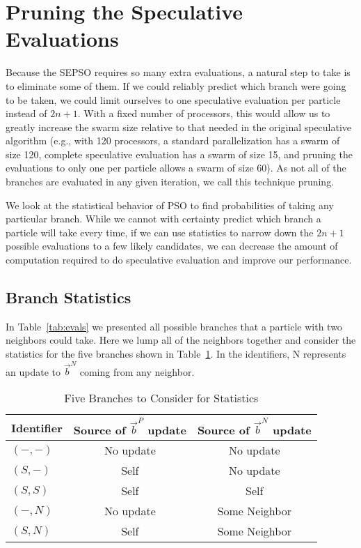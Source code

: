 \documentclass[ms,electronic,twosidetoc,letterpaper,chaptercenter,parttop,equalmargins]{byumsphd}
\providecommand{\pers}{\ensuremath{P}}
\providecommand{\neigh}{\ensuremath{N}}
\providecommand{\nbest}{\ensuremath{\Vec{b}^\neigh}}
\providecommand{\pbest}{\ensuremath{\Vec{b}^\pers}}
\providecommand{\casexn}{\ensuremath{(S,-)}}
\providecommand{\casexx}{\ensuremath{(S,S)}}
\providecommand{\casepn}{\ensuremath{(-,-)}}
\providecommand{\casepN}{\ensuremath{(-,N)}}
\providecommand{\casexN}{\ensuremath{(S,N)}}
\begin{document}
\section{Pruning the Speculative Evaluations}
\label{sec:pruning}

Because the SEPSO requires so many extra evaluations, a natural step to take is
to eliminate some of them.  If we could reliably predict which branch were
going to be taken, we could limit ourselves to one speculative evaluation per
particle instead of $2n+1$.  With a fixed number of processors, this would
allow us to greatly increase the swarm size relative to that needed in the
original speculative algorithm (e.g., with 120 processors, a standard
parallelization has a swarm of size 120, complete speculative evaluation has a
swarm of size 15, and pruning the evaluations to only one per particle allows a
swarm of size 60).  As not all of the branches are evaluated in any given
iteration, we call this technique pruning.

We look at the statistical behavior of PSO to find probabilities of taking any
particular branch.  While we cannot with certainty predict which branch a
particle will take every time, if we can use statistics to narrow down the
$2n+1$ possible evaluations to a few likely candidates, we can decrease the
amount of computation required to do speculative evaluation and improve our
performance.

\subsection{Branch Statistics}
\label{sec:statistics}

In Table~\ref{tab:evals} we presented all possible branches that a particle
with two neighbors could take.  Here we lump all of the neighbors together and
consider the statistics for the five branches shown in
Table~\ref{tab:branches}.  In the identifiers, N represents an update to
$\nbest$ coming from any neighbor.

\begin{table}[ht]
  \caption{Five Branches to Consider for Statistics}
  \label{tab:branches}
  \centering
  \begin{tabular}{lcc}
	Identifier&Source of $\pbest$ update&Source of $\nbest$ update\\
	\hline
	\hline
	$\casepn$&No update&No update\\
	\hline
	$\casexn$&Self&No update\\
	\hline
	$\casexx$&Self&Self\\
	\hline
	$\casepN$&No update&Some Neighbor\\
	\hline
	$\casexN$&Self&Some Neighbor\\
	\hline
  \end{tabular}
\end{table}
\end{document}
